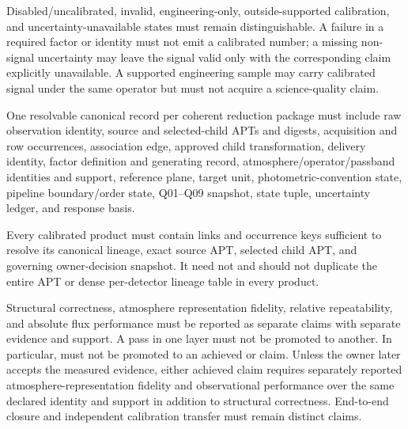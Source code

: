 \begin{description}[style=nextline]
\item[\Req{046}: truthful no-output states.]
  Disabled/uncalibrated, invalid, engineering-only, outside-supported
  calibration, and uncertainty-unavailable states must remain
  distinguishable. A failure in a required factor or identity must not emit a
  calibrated number; a missing non-signal uncertainty may leave the signal
  valid only with the corresponding claim explicitly unavailable. A supported
  engineering sample may carry calibrated signal under the same operator but
  must not acquire a science-quality claim.

\item[\Req{047}: canonical lineage record.]
  One resolvable canonical record per coherent reduction package must include
  raw observation identity, source and selected-child APTs and digests,
  acquisition and row occurrences, association edge, approved child
  transformation, delivery identity, factor definition and generating record,
  atmosphere/operator/passband identities and support, reference plane,
  target unit, photometric-convention state, pipeline boundary/order state,
  Q01--Q09 snapshot, state tuple, uncertainty ledger, and response basis.

\item[\Req{048}: compact product links.]
  Every calibrated product must contain links and occurrence keys sufficient
  to resolve its canonical lineage, exact source APT, selected child APT, and
  governing owner-decision snapshot. It need not and should not duplicate the
  entire APT or dense per-detector lineage table in every product.

\item[\Req{049}: separated claim status.]
  Structural correctness, atmosphere representation fidelity, relative
  repeatability, and absolute flux performance must be reported as separate
  claims with separate evidence and support. A pass in one layer must not be
  promoted to another. In particular,
   must not be promoted to an achieved
   or  claim. Unless the owner
  later accepts the measured evidence, either achieved claim requires
  separately reported atmosphere-representation fidelity and observational
  performance over the same declared identity and support in addition to
  structural correctness. End-to-end closure and independent calibration
  transfer must remain distinct claims.


\end{description}
